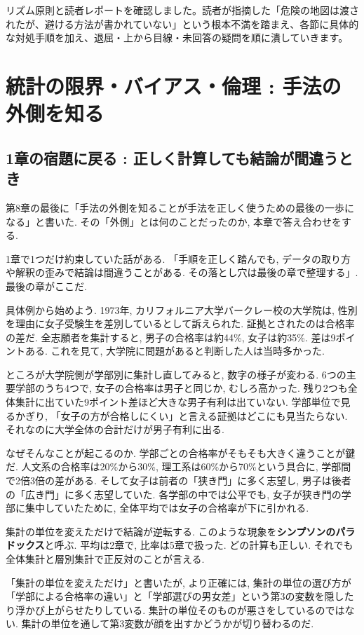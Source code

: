 ﻿リズム原則と読者レポートを確認しました。読者が指摘した「危険の地図は渡されたが、避ける方法が書かれていない」という根本不満を踏まえ、各節に具体的な対処手順を加え、退屈・上から目線・未回答の疑問を順に潰していきます。

\section{統計の限界・バイアス・倫理 : 手法の外側を知る}

\subsection{1章の宿題に戻る : 正しく計算しても結論が間違うとき}

第8章の最後に「手法の外側を知ることが手法を正しく使うための最後の一歩になる」と書いた. その「外側」とは何のことだったのか, 本章で答え合わせをする.

1章で1つだけ約束していた話がある. 「手順を正しく踏んでも, データの取り方や解釈の歪みで結論は間違うことがある. その落とし穴は最後の章で整理する」. 最後の章がここだ.

具体例から始めよう.
1973年, カリフォルニア大学バークレー校の大学院は, 性別を理由に女子受験生を差別しているとして訴えられた.
証拠とされたのは合格率の差だ. 全志願者を集計すると, 男子の合格率は約44\%, 女子は約35\%. 差は9ポイントある.
これを見て, 大学院に問題があると判断した人は当時多かった.

ところが大学院側が学部別に集計し直してみると, 数字の様子が変わる.
6つの主要学部のうち4つで, 女子の合格率は男子と同じか, むしろ高かった.
残り2つも全体集計に出ていた9ポイント差ほど大きな男子有利は出ていない.
学部単位で見るかぎり, 「女子の方が合格しにくい」と言える証拠はどこにも見当たらない.
それなのに大学全体の合計だけが男子有利に出る.

なぜそんなことが起こるのか.
学部ごとの合格率がそもそも大きく違うことが鍵だ.
人文系の合格率は20\%から30\%, 理工系は60\%から70\%という具合に, 学部間で2倍3倍の差がある.
そして女子は前者の「狭き門」に多く志望し, 男子は後者の「広き門」に多く志望していた.
各学部の中では公平でも, 女子が狭き門の学部に集中していたために, 全体平均では女子の合格率が下に引かれる.

集計の単位を変えただけで結論が逆転する. このような現象を\textbf{シンプソンのパラドックス}と呼ぶ.
平均は2章で, 比率は5章で扱った. どの計算も正しい.
それでも全体集計と層別集計で正反対のことが言える.

「集計の単位を変えただけ」と書いたが, より正確には, 集計の単位の選び方が「学部による合格率の違い」と「学部選びの男女差」という第3の変数を隠したり浮かび上がらせたりしている.
集計の単位そのものが悪さをしているのではない. 集計の単位を通して第3変数が顔を出すかどうかが切り替わるのだ.

